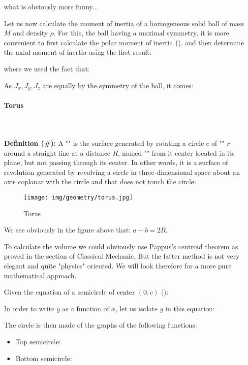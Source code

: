 {	what is obviously more funny...

	Let us now calculate the moment of inertia of a homogeneous solid ball of mass $M$ and density $\rho$. For this, the ball having a maximal symmetry, it is more convenient to first calculate the polar moment of inertia (), and then determine the axial moment of inertia using the first result:
	
	where we used the fact that:
	
	As $J_x,J_y,J_z$ are equally by the symmetry of the ball, it comes:
	
	
	\pagebreak
	\paragraph{Torus}\mbox{}\\\\
	\textbf{Definition (\#\mydef):} A "" is the surface generated by rotating a circle $c$ of "" $r$ around a straight line at a distance $R$, named "" from it center located in its plane, but not passing through its center. In other words,  it is a surface of revolution generated by revolving a circle in three-dimensional space about an axis coplanar with the circle and that does not touch the circle:
	\begin{figure}[H]
		\centering
		\texttt{[image: img/geometry/torus.jpg]}
		\caption{Torus}
	\end{figure}
	We see obviously in the figure above that: $a-b=2R$.
	
	To calculate the volume we could obviously use Pappus's centroid theorem as proved in the section of Classical Mechanic. But the latter method is not very elegant and quite "physics" oriented. We will look therefore for a more pure mathematical approach.
	
	Given the equation of a semicircle of center $(0, c)$ ():
	
	In order to write $y$ as a function of $x$, let us isolate $y$ in this equation:
	
	The circle is then made of the graphs of the following functions:
	\begin{itemize} 
		\item Top semicircle:
		

		\item Bottom semicircle:
		

\end{itemize}}
